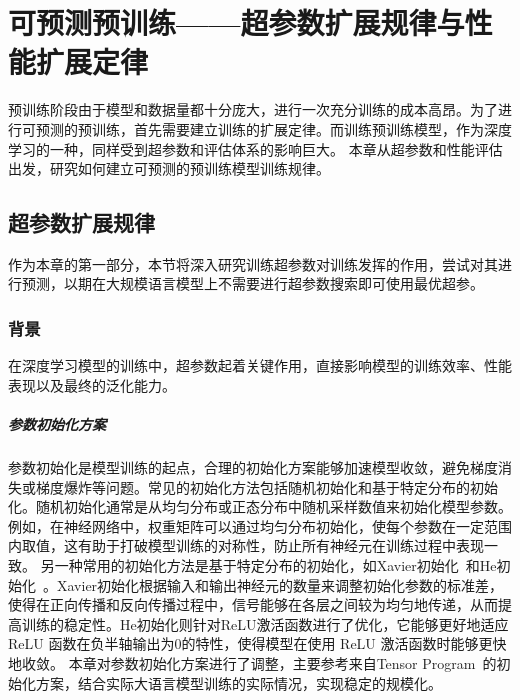 
\chapter{可预测预训练——超参数扩展规律与性能扩展定律}

预训练阶段由于模型和数据量都十分庞大，进行一次充分训练的成本高昂。为了进行可预测的预训练，首先需要建立训练的扩展定律。而训练预训练模型，作为深度学习的一种，同样受到超参数和评估体系的影响巨大。
本章从超参数和性能评估出发，研究如何建立可预测的预训练模型训练规律。

\section{超参数扩展规律}
作为本章的第一部分，本节将深入研究训练超参数对训练发挥的作用，尝试对其进行预测，以期在大规模语言模型上不需要进行超参数搜索即可使用最优超参。

\subsection{背景}

在深度学习模型的训练中，超参数起着关键作用，直接影响模型的训练效率、性能表现以及最终的泛化能力。

\paragraph{参数初始化方案}
参数初始化是模型训练的起点，合理的初始化方案能够加速模型收敛，避免梯度消失或梯度爆炸等问题。常见的初始化方法包括随机初始化和基于特定分布的初始化。随机初始化通常是从均匀分布或正态分布中随机采样数值来初始化模型参数。例如，在神经网络中，权重矩阵可以通过均匀分布初始化，使每个参数在一定范围内取值，这有助于打破模型训练的对称性，防止所有神经元在训练过程中表现一致。
另一种常用的初始化方法是基于特定分布的初始化，如Xavier初始化~\cite{pmlr-v9-glorot10a}和He初始化~\cite{he2015delving}。Xavier初始化根据输入和输出神经元的数量来调整初始化参数的标准差，使得在正向传播和反向传播过程中，信号能够在各层之间较为均匀地传递，从而提高训练的稳定性。He初始化则针对ReLU激活函数进行了优化，它能够更好地适应 ReLU 函数在负半轴输出为0的特性，使得模型在使用 ReLU 激活函数时能够更快地收敛。
本章对参数初始化方案进行了调整，主要参考来自Tensor Program~\cite{yang2022tensor}的初始化方案，结合实际大语言模型训练的实际情况，实现稳定的规模化。


